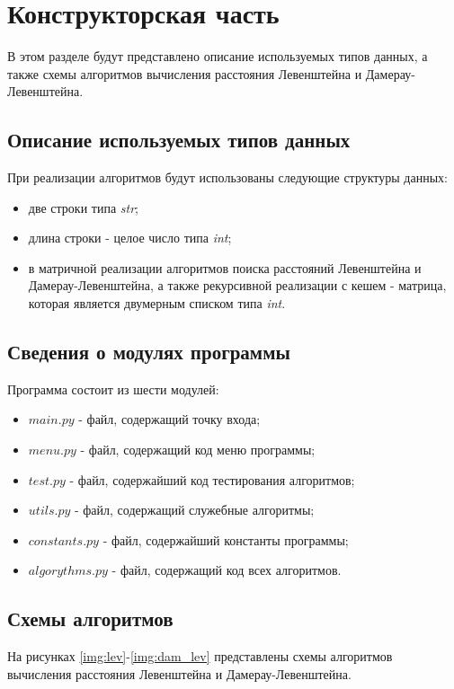 \chapter{Конструкторская часть}
В этом разделе будут представлено описание используемых типов данных, а также схемы алгоритмов вычисления расстояния Левенштейна и Дамерау-Левенштейна.

\section{Описание используемых типов данных}
При реализации алгоритмов будут использованы следующие структуры данных:

\begin{itemize}
    \item две строки типа \textit{str};
    \item длина строки - целое число типа \textit{int};
    \item в матричной реализации алгоритмов поиска расстояний Левенштейна и Дамерау-Левенштейна, а также рекурсивной реализации с кешем - матрица, которая является двумерным списком типа \textit{int}.
\end{itemize}


\section{Сведения о модулях программы}
Программа состоит из шести модулей:
\begin{itemize}
	\item $main.py$ - файл, содержащий точку входа;
    \item $menu.py$ - файл, содержащий код меню программы;
    \item $test.py$ - файл, содержайший код тестирования алгоритмов;
    \item $utils.py$ - файл, содержащий служебные алгоритмы;
    \item $constants.py$ - файл, содержайший константы программы;
    \item $algorythms.py$ - файл, содержащий код всех алгоритмов. \newline
\end{itemize}


\section{Схемы алгоритмов}
На рисунках \ref{img:lev}-\ref{img:dam_lev} представлены схемы алгоритмов вычисления расстояния Левенштейна и Дамерау-Левенштейна.

